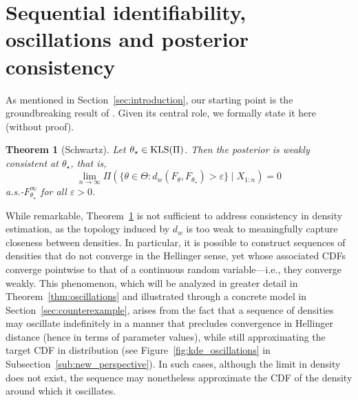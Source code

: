 \documentclass[11pt,twoside]{article}
\newtheorem{theorem}{Theorem}
\newcommand{\kls}{\textnormal{KLS}}
\begin{document}
\section{Sequential identifiability, oscillations and posterior consistency}\label{sec:seq_identifiability}


As mentioned in Section~\ref{sec:introduction}, our starting point is the groundbreaking result of \cite{schwartz1964consistency}. Given its central role, we formally state it here (without proof).

\begin{theorem}[Schwartz]\label{thm:schwartz}
    Let $\theta_\star\in\kls(\Pi)$. Then the posterior is weakly consistent at $\theta_\star$, that is,
    \begin{equation*}
        \lim_{n \to \infty} \Pi(\{\theta \in \Theta : d_w(F_\theta, F_{\theta_\star}) > \varepsilon\} \mid X_{1:n}) = 0
    \end{equation*}
    a.s.-$F_{\theta_\star}^\infty$ for all \(\varepsilon > 0\).
\end{theorem}

While remarkable, Theorem~\ref{thm:schwartz} is not sufficient to address consistency in density estimation, as the topology induced by \(d_w\) is too weak to meaningfully capture closeness between densities. In particular, it is possible to construct sequences of densities that do not converge in the Hellinger sense, yet whose associated CDFs converge pointwise to that of a continuous random variable—i.e., they converge weakly. This phenomenon, which will be analyzed in greater detail in Theorem~\ref{thm:oscillations} and illustrated through a concrete model in Section~\ref{sec:counterexample}, arises from the fact that a sequence of densities may oscillate indefinitely in a manner that precludes convergence in Hellinger distance (hence in terms of parameter values), while still approximating the target CDF in distribution (see Figure~\ref{fig:kde_oscillations} in Subsection~\ref{sub:new_perspective}). In such cases, although the limit in density does not exist, the sequence may nonetheless approximate the CDF of the density around which it oscillates.
\end{document}

